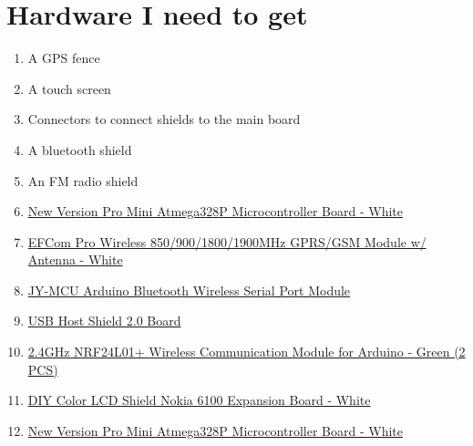 \documentclass[11pt]{article}
\begin{document}
\section{Hardware I need to get}
\label{sec-5}

\begin{enumerate}
\item A GPS fence
\item A touch screen
\item Connectors to connect shields to the main board
\item A bluetooth shield
\item An FM radio shield
\item \href{http://dx.com/p/new-version-pro-mini-atmega328p-microcontroller-board-white-173878}{New Version Pro Mini Atmega328P Microcontroller Board - White}
\item \href{http://dx.com/p/efcom-pro-wireless-850-900-1800-1900mhz-gprs-gsm-module-w-antenna-white-173749}{EFCom Pro Wireless 850/900/1800/1900MHz GPRS/GSM Module w/ Antenna - White}
\item \href{http://dx.com/p/jy-mcu-arduino-bluetooth-wireless-serial-port-module-104299}{JY-MCU Arduino Bluetooth Wireless Serial Port Module}
\item \href{http://dx.com/p/usb-host-shield-2-0-board-166217}{USB Host Shield 2.0 Board}
\item \href{http://dx.com/p/2-4ghz-nrf24l01-wireless-communication-module-for-arduino-green-2-pcs-149255}{2.4GHz NRF24L01+ Wireless Communication Module for Arduino - Green (2 PCS)}
\item \href{http://dx.com/p/diy-colorful-lcd-shield-nokia-6100-expansion-board-white-171914}{DIY Color LCD Shield Nokia 6100 Expansion Board - White}
\item \href{http://www.ebay.com/itm/130839929399?ssPageName=STRK:MEWNX:IT&_trksid=p3984.m1497.l2649}{New Version Pro Mini Atmega328P Microcontroller Board - White}
\end{enumerate}
\end{document}
